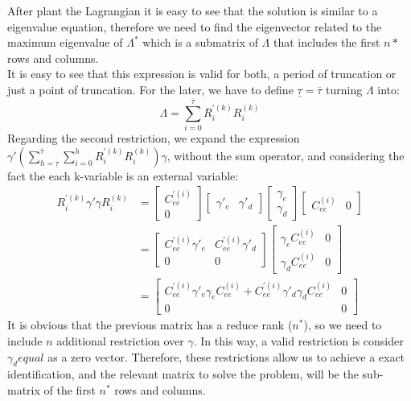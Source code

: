 \documentclass[12pt, a4paper]{article}
\begin{document}
After plant the Lagrangian it is easy to see that the solution is similar to a eigenvalue equation,  therefore we need to find the eigenvector related to the maximum eigenvalue of $\Lambda^*$ which is a submatrix of $\Lambda$ that includes the first $n*$ rows and columns. \\
It is easy to see that this expression is valid for both, a period of truncation or just a point of truncation. For the later, we have to define $\underline{\tau} = \overline{\tau}$ turning $\Lambda$ into:
\begin{equation*}
\Lambda = \sum_{i=0}^{\overline{\tau}} R^{'(k)}_iR^{(k)}_i
\end{equation*}
Regarding the second restriction, we expand the expression $\gamma' \left( \sum_{h =\underline{\tau}}^{\overline{\tau}}\sum_{i=0}^h  R_{i}^{'(k)}R_{i}^{(k)} \right) \gamma$, without the sum operator, and considering the fact the each k-variable is an external variable:
\begin{equation*}
\begin{aligned}
R^{'(k)}_i\gamma' \gamma R_i^{(k)} &= \left[ \begin{array}{c}  C_{ee}^{'(i)}  \\ 0 \end{array} \right] \left[ \begin{array}{cc}  \gamma'_e & \gamma'_d  \end{array} \right] \left[ \begin{array}{c}  \gamma_e  \\ \gamma_d  \end{array} \right]
\left[ \begin{array}{cc}  C_{ee}^{(i)} &  0 \end{array} \right] \\
 &= \left[ \begin{array}{cc} C^{'(i)}_{ee}\gamma'_e & C^{'(i)}_{ee}\gamma'_d  \\ 0 & 0 \end{array} \right]
 \left[ \begin{array}{cc} \gamma_e C^{(i)}_{ee} & 0  \\ \gamma_d C^{(i)}_{ee} & 0 \end{array} \right] \\
 &= \left[ \begin{array}{cc} C^{'(i)}_{ee}\gamma'_e \gamma_e C^{(i)}_{ee} + C^{'(i)}_{ee}\gamma'_d \gamma_d C^{(i)}_{ee}  & 0 \\ 0 & 0 \end{array} \right]
\end{aligned}
\end{equation*}
It is obvious that the previous matrix has a reduce rank ($n^*$), so we need to include $n$ additional restriction over $\gamma$. In this way, a valid restriction is consider $\gamma_d equal$ as a zero vector. Therefore, these restrictions allow us to achieve a exact identification, and the relevant matrix to solve the problem, will be the sub-matrix of the first $n^*$ rows and columns.
\clearpage
\end{document}
